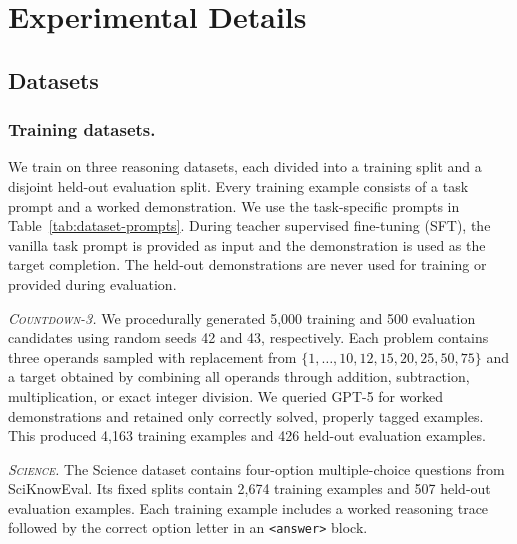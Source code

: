 \documentclass{article} %
\theoremstyle{plain}
\theoremstyle{definition}
\theoremstyle{remark}
\begin{document}
\clearpage
\section{Experimental Details}
\label{app:experimental_details}



\subsection{Datasets}
\label{app:experimental_details:datasets}
\subsubsection{Training datasets.}

We train on three reasoning datasets, each divided into a training split and a disjoint held-out evaluation split. Every training example consists of a task prompt and a worked demonstration. We use the task-specific prompts in Table~\ref{tab:dataset-prompts}. During teacher supervised fine-tuning (SFT), the vanilla task prompt is provided as input and the demonstration is used as the target completion. The held-out demonstrations are never used for training or provided during evaluation.

\textit{\textsc{Countdown-3}.}
We procedurally generated 5,000 training and 500 evaluation candidates using random seeds 42 and 43, respectively. Each problem contains three operands sampled with replacement from
$\{1,\ldots,10,12,15,20,25,50,75\}$ and a target obtained by combining all operands through addition, subtraction, multiplication, or exact integer division. We queried GPT-5 for worked demonstrations and retained only correctly solved, properly tagged examples. This produced 4,163 training examples and 426 held-out evaluation examples.

\textit{\textsc{Science}.}
The Science dataset contains four-option multiple-choice questions from SciKnowEval. Its fixed splits contain 2,674 training examples and 507 held-out evaluation examples. Each training example includes a worked reasoning trace followed by the correct option letter in an \texttt{<answer>} block.
\end{document}
